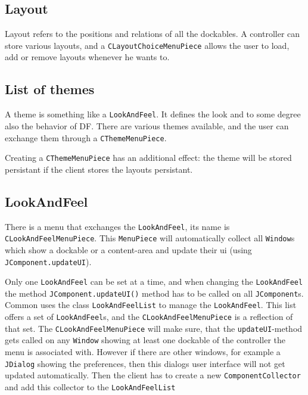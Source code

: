 \documentclass[a4paper,10pt]{article}
\newcommand{\src}[1]{\lstinline[basicstyle=\ttfamily]|#1|}
\begin{document}
\subsection{Layout}
Layout refers to the positions and relations of all the dockables. A controller can store various layouts, and a \src{CLayoutChoiceMenuPiece} allows the user to load, add or remove layouts whenever he wants to.

\subsection{List of themes}
A theme is something like a \src{LookAndFeel}. It defines the look and to some degree also the behavior of DF. There are various themes available, and the user can exchange them through a \src{CThemeMenuPiece}.

Creating a \src{CThemeMenuPiece} has an additional effect: the theme will be stored persistant if the client stores the layouts persistant.

\subsection{LookAndFeel}
There is a menu that exchanges the \src{LookAndFeel}, its name is \src{CLookAndFeelMenuPiece}. This \src{MenuPiece} will automatically collect all \src{Window}s which show a dockable or a content-area and update their ui (using \src{JComponent.updateUI}).

Only one \src{LookAndFeel} can be set at a time, and when changing the \src{LookAndFeel} the method \src{JComponent.updateUI()} method has to be called on all \src{JComponent}s. Common uses the class \src{LookAndFeelList} to manage the \src{LookAndFeel}. This list offers a set of \src{LookAndFeel}s, and the \src{CLookAndFeelMenuPiece} is a reflection of that set. The \src{CLookAndFeelMenuPiece} will make sure, that the \src{updateUI}-method gets called on any \src{Window} showing at least one dockable of the controller the menu is associated with. However if there are other windows, for example a \src{JDialog} showing the preferences, then this dialogs user interface will not get updated automatically. Then the client has to create a new \src{ComponentCollector} and add this collector to the \src{LookAndFeelList}
\end{document}
